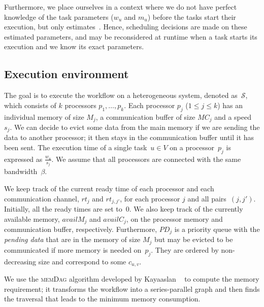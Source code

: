 \documentclass[conference]{IEEEtran}
\newcommand{\algo}[1]{\textsc{#1}}
\newcommand{\cluster}{\,\mathcal{S}}
\newcommand{\MM}{M}
\newcommand{\rt}{rt}
\newcommand{\PD}{PD}
\newcommand{\hmey}[1]{{\color{red}[HM: #1]}}
\newcommand{\AB}[1]{{\color{purple}[AB: #1]}}
\begin{document}
Furthermore, we place ourselves in a context where we do not have perfect knowledge
of the task parameters ($w_u$ and $m_u$) before the tasks start their execution,
but only estimates~\cite{rahman2013,GARG2015256}.  
Hence, scheduling decisions are made on these estimated parameters, and
may be reconsidered at runtime when a task starts its execution and we know its exact parameters.


    \subsection{Execution environment}
    \label{sec.mod.plat}

    The goal is to execute the workflow on a heterogeneous system, denoted as $\cluster$, which
    consists of $k$ processors $p_1, \dots, p_k$.
    Each processor $p_j$ ($1 \leq j \leq k$) has an individual memory of size $M_j$, a communication
    buffer of size $MC_j$ and a speed~$s_j$.
    We can decide to evict some data from the main memory if we are sending the data
    to another processor; it then stays in the communication buffer until it has been sent.
    The execution time of a single task~$u\in V$ on a processor~$p_j$ is expressed as $\frac{w_u}{s_j}$.
    We assume that all processors are connected with the same bandwidth~$\beta$.

    We keep track of the current ready time of each processor and each communication
    channel, $\rt_j$ and $\rt_{j,j'}$, for each processor $j$ and all pairs~$(j,j')$.
    Initially, all the ready times are set to~$0$.
    We also keep track of the currently available memory, $availM_j$ and $availC_j$,
    on the processor memory and communication buffer, respectively.
    Furthermore, $\PD_j$ is a priority queue with the {\em pending data}
    that are in the memory of size $\MM_j$ but may be evicted to be communicated if
    more memory is needed on~$p_j$. They are ordered by non-decreasing size and
    correspond to some $c_{u,v}$.

    We use the \algo{memDag} algorithm developed by Kayaaslan \etal~\cite{KAYAASLAN20181} to compute
    the memory requirement; it transforms the workflow into a series-parallel graph
    and then finds the traversal that leads to the minimum memory consumption.
\end{document}

